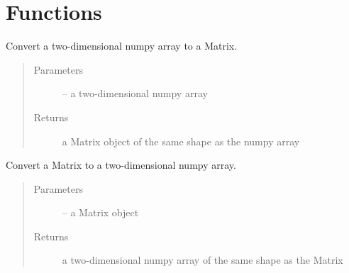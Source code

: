 \documentclass[letterpaper,10pt,english]{sphinxmanual}
\begin{document}
\chapter{Functions}
\label{\detokenize{index:functions}}

\begin{fulllineitems}
\label{\detokenize{index:dbm_py.interface.np2darray_to_float_matrix}}
Convert a two-dimensional numpy array to a Matrix.
\begin{quote}\begin{description}
\item[{Parameters}] \leavevmode
{} -- a two-dimensional numpy array

\item[{Returns}] \leavevmode
a Matrix object of the same shape as the numpy array

\end{description}\end{quote}

\end{fulllineitems}


\begin{fulllineitems}
\label{\detokenize{index:dbm_py.interface.float_matrix_to_np2darray}}
Convert a Matrix to a two-dimensional numpy array.
\begin{quote}\begin{description}
\item[{Parameters}] \leavevmode
{} -- a Matrix object

\item[{Returns}] \leavevmode
a two-dimensional numpy array of the same shape as the Matrix

\end{description}\end{quote}

\end{fulllineitems}

\end{document}

